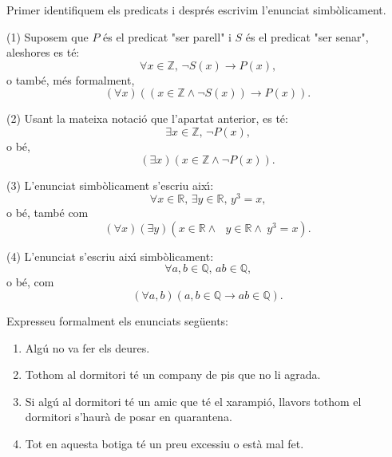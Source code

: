 \begin{solucio}
Primer identifiquem els predicats i despr\'{e}s escrivim l'enunciat simb\`{o}licament.

(1) Suposem que $P$ \'{e}s el predicat "ser parell" i $S$ \'{e}s el predicat
"ser senar", aleshores es t\'{e}:%
\[
\forall x\in\mathbb{Z}\text{, }\lnot S(x)\longrightarrow P(x)\text{,}%
\]
o tamb\'{e}, m\'{e}s formalment,
\[
\left(  \forall x\right)  \left(  \left(  x\in\mathbb{Z}\wedge\lnot
S(x)\right)  \longrightarrow P\left(  x\right)  \right)  \text{.}%
\]


(2) Usant la mateixa notaci\'{o} que l'apartat anterior, es t\'{e}:%
\[
\exists x\in\mathbb{Z}\text{, }\lnot P\left(  x\right)  \text{,}%
\]
o b\'{e},%
\[
\left(  \exists x\right)  \left(  x\in\mathbb{Z\wedge}\lnot P\left(  x\right)
\right)  \text{.}%
\]


(3) L'enunciat simb\`{o}licament s'escriu aix\'{\i}:%
\[
\forall x\in\mathbb{R}\text{, }\exists y\in\mathbb{R}\text{, }y^{3}=x\text{,}%
\]
o b\'{e}, tamb\'{e} com%
\[
\left(  \forall x\right)  \left(  \exists y\right)  \left(  x\in
\mathbb{R\wedge}\text{ }y\in\mathbb{R\wedge~}y^{3}=x\right)  \text{.}%
\]


(4) L'enunciat s'escriu aix\'{\i} simb\`{o}licament:%
\[
\forall a,b\in\mathbb{Q}\text{, }ab\in\mathbb{Q}\text{,}%
\]
o b\'{e}, com%
\[
\left(  \forall a,b\right)  \left(  a,b\in\mathbb{Q}\longrightarrow
ab\in\mathbb{Q}\right)  \text{.}%
\]

\end{solucio}

\begin{exer}
Expresseu formalment els enunciats seg\"{u}ents:

\begin{enumerate}
\item Alg\'{u} no va fer els deures.

\item Tothom al dormitori t\'{e} un company de pis que no li agrada.

\item Si alg\'{u} al dormitori t\'{e} un amic que t\'{e} el xarampi\'{o},
llavors tothom el dormitori s'haur\`{a} de posar en quarantena.

\item Tot en aquesta botiga t\'{e} un preu excessiu o est\`{a} mal fet.
\end{enumerate}
\end{exer}

